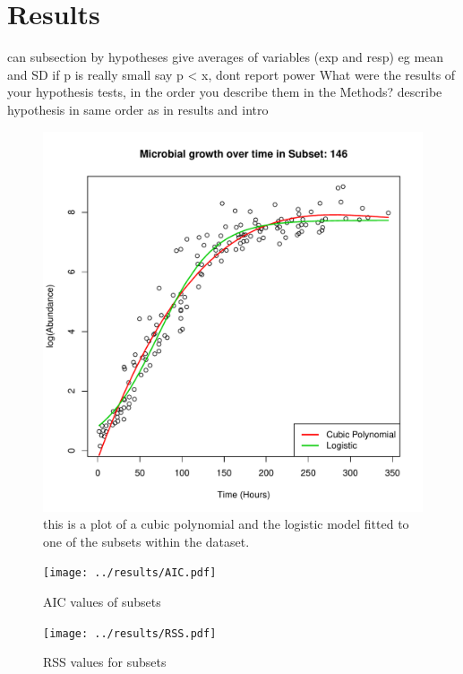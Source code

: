 \documentclass[11pt, titlepage]{article}
\begin{document}
    \section*{Results}

    can subsection by hypotheses
    give averages of variables (exp and resp) eg mean and SD
    if p is really small say p < x, dont report power
    What  were  the  results of  your hypothesis  tests,  in  the  order  you describe  them  in  the Methods?
    describe hypothesis in same order as in results and intro

    \begin{figure}[H]
    \centering
    \includegraphics[scale=0.75]{../Plots/PlotID146.pdf}
    \caption{this is a plot of a cubic polynomial and the logistic model fitted to one of the subsets within the dataset.}
    \end{figure}

    \begin{figure}[H]
    \centering
    \texttt{[image: ../results/AIC.pdf]}
    \caption{AIC values of subsets}
    \end{figure}

        \begin{figure}[H]
    \centering
    \texttt{[image: ../results/RSS.pdf]}
    \caption{RSS values for subsets}
    \end{figure}
\end{document}
